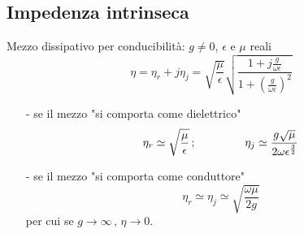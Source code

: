 \documentclass[a4paper]{article}
\begin{document}
\subsection*{Impedenza intrinseca}
Mezzo dissipativo per conducibilità: $g\neq 0$, $\epsilon$ e $\mu$ reali
\begin{equation*}
\eta=\eta_r+j\eta_j=\sqrt{\frac{\mu}{\epsilon}}\sqrt{\frac{1+j\frac{g}{\omega\epsilon}}{1+\left(\frac{g}{\omega\epsilon}\right)^2}}
\end{equation*}
\begin{itemize}
\item[-] se il mezzo "si comporta come dielettrico"
\begin{equation*}
\eta_r\simeq\sqrt{\frac{\mu}{\epsilon}}\,;\hspace{15mm}\eta_j\simeq\frac{g\sqrt{\mu}}{2\omega\epsilon^{\frac{3}{2}}}
\end{equation*}
\item[-] se il mezzo "si comporta come conduttore"
\begin{equation*}
\eta_r\simeq\eta_j\simeq\sqrt{\frac{\omega\mu}{2g}}
\end{equation*}
per cui se $g\rightarrow\infty\,$, $\eta\rightarrow0$.
\end{itemize}
\end{document}
